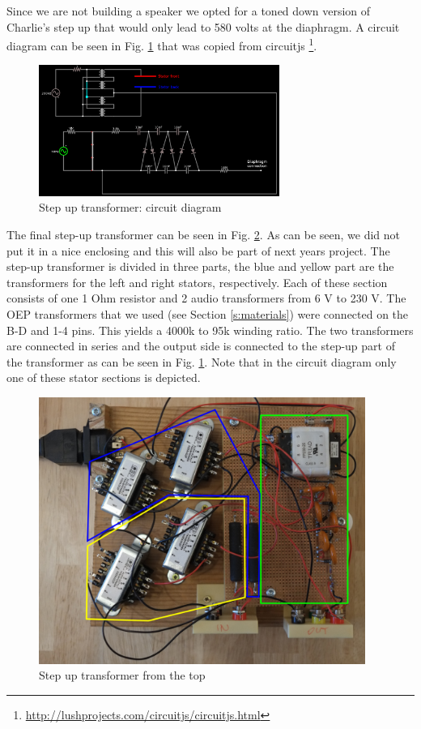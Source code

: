 \documentclass{article}
\begin{document}
Since we are not building a speaker we opted for a toned down version of Charlie's step up that would only lead to 580 volts at the diaphragm. A circuit diagram can be seen in Fig. \ref{f:amp:step-up} that was copied from circuitjs \footnote{\url{http://lushprojects.com/circuitjs/circuitjs.html}}.

\begin{figure}[htb]
    \centering
    \includegraphics[width=0.7\textwidth]{images/step-up-transformer.png}
    \caption{Step up transformer: circuit diagram}
    \label{f:amp:step-up}
\end{figure}

The final step-up transformer can be seen in Fig. \ref{f:amp:step-up-real}. As can be seen, we did not put it in a nice enclosing and this will also be part of next years project. The step-up transformer is divided in three parts, the blue and yellow part are the transformers for the left and right stators, respectively. Each of these section consists of one 1 Ohm resistor and 2 audio transformers from 6 V to 230 V. The OEP transformers that we used (see Section \ref{s:materials}) were connected on the B-D and 1-4 pins. This yields a 4000k to 95k winding ratio. The two transformers are connected in series and the output side is connected to the step-up part of the transformer as can be seen in Fig. \ref{f:amp:step-up}. Note that in the circuit diagram only one of these stator sections is depicted.

\begin{figure}[htb]
    \centering
    \includegraphics[width=0.95\textwidth]{images/step-up-real-top.png}
    \caption{Step up transformer from the top}
    \label{f:amp:step-up-real}
\end{figure}
\end{document}
